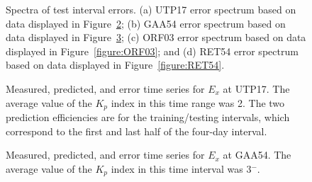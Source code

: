 \documentclass[linenumbers,draft]{agujournal}
\begin{document}
\clearpage

\begin{figure}[htb]
\vspace{1em}
  \caption{Spectra of test interval errors. (a) UTP17 error spectrum based on data displayed in Figure~\ref{figure:UTP17}; (b) GAA54 error spectrum based on data displayed in Figure~\ref{figure:GAA54}; (c) ORF03 error spectrum based on data displayed in Figure~\ref{figure:ORF03}; and (d) RET54 error spectrum based on data displayed in Figure~\ref{figure:RET54}.}
\label{figure:EySpectra}
\end{figure}


\begin{figure}[h]
\centering
\caption{Measured, predicted, and error time series for $E_x$ at UTP17. The average value of the $K_p$ index in this time range was 2.  The two prediction efficiencies are for the training/testing intervals, which correspond to the first and last half of the four-day interval.}
\label{figure:UTP17}
\end{figure}


\begin{figure}[h]
\centering
\caption{Measured, predicted, and error time series for $E_x$ at GAA54.  The average value of the $K_p$ index in this time interval was 3$^-$.}
\label{figure:GAA54}
\end{figure}
\end{document}

